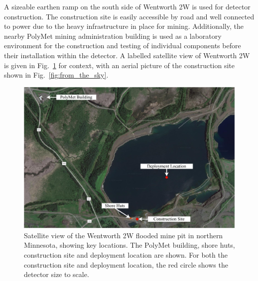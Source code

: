 A sizeable earthen ramp on the south side of Wentworth 2W is used for detector construction. The
construction site is easily accessible by road and well connected to power due to the heavy
infrastructure in place for mining. Additionally, the nearby PolyMet mining administration
building is used as a laboratory environment for the construction and testing of individual
components before their installation within the detector. A labelled satellite view of Wentworth
2W is given in Fig.~\ref{fig:pit} for context, with an aerial picture of the construction site
shown in Fig.~\ref{fig:from_the_sky}.

\begin{figure} %
    \includegraphics[width=\textwidth]{diagrams/4-chips/pit.pdf}
    \caption[Satellite view of the Wentworth 2W mine pit in northern Minnesota]
    {Satellite view of the Wentworth 2W flooded mine pit in northern Minnesota, showing key
        \chipsfive locations. The PolyMet building, shore huts, construction site and deployment
        location are shown. For both the construction site and deployment location, the red circle
        shows the \chipsfive detector size to scale.}
    \label{fig:pit}
\end{figure}

